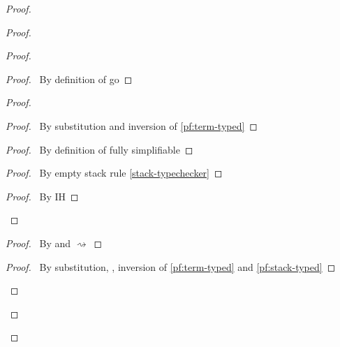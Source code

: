 \documentclass[a4paper]{article}
\begin{document}
\begin{proof}
\begin{proof}
\begin{proof}
      \begin{proof}
        \pf\ By definition of \textsf{go}
      \end{proof}
      \begin{proof}
        \begin{proof}
          \pf\ By substitution and inversion of \ref{pf:term-typed}
        \end{proof}
        \begin{proof}
          \pf\ By definition of fully simplifiable
        \end{proof}
        \begin{proof}
          \pf\ By empty stack rule \ref{stack-typechecker}
        \end{proof}
        \qedstep
        \begin{proof}
          \pf\ By IH
        \end{proof}
      \end{proof}
      \begin{proof}
        \pf\ By  and $\rightsquigarrow$
      \end{proof}
      \begin{proof}
        \pf\ By substitution, , inversion of \ref{pf:term-typed} and \ref{pf:stack-typed}
      \end{proof}

\end{proof}
\end{proof}
\end{proof}
\end{document}
